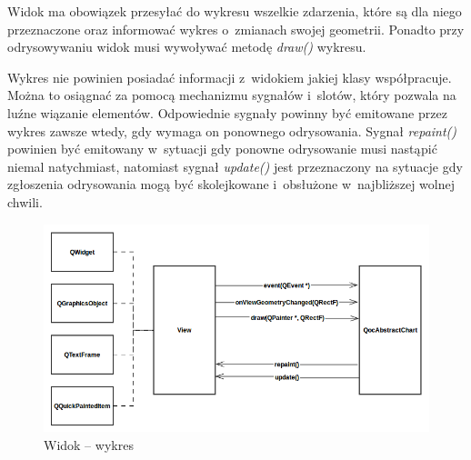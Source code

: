 Widok ma obowiązek przesyłać do wykresu wszelkie zdarzenia, które są dla niego przeznaczone oraz informować wykres o~zmianach swojej geometrii. Ponadto przy odrysowywaniu widok musi wywoływać metodę \textit{draw()} wykresu.

Wykres nie powinien posiadać informacji z~widokiem jakiej klasy współpracuje. Można to osiągnać za pomocą mechanizmu sygnałów i~slotów, który pozwala na luźne wiązanie elementów. Odpowiednie sygnały  powinny być emitowane przez wykres zawsze wtedy, gdy wymaga on ponownego odrysowania.
Sygnał \textit{repaint()} powinien być emitowany w~sytuacji gdy ponowne odrysowanie musi nastąpić niemal natychmiast, natomiast sygnał \textit{update()} jest przeznaczony na sytuacje gdy zgłoszenia odrysowania mogą być skolejkowane i~obsłużone w~najbliższej wolnej chwili.


\begin{figure}
\centering
\caption{Widok -- wykres}\label{rys:widok:wykres}
\includegraphics[scale=0.8]{img/widok-wykres.png}
\end{figure}



